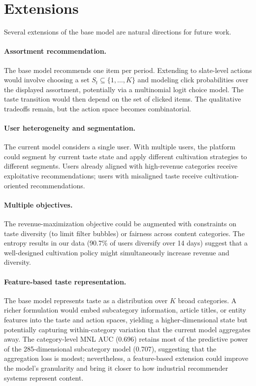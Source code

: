 \documentclass[11pt]{article}
\begin{document}
\section{Extensions}
\label{sec:extensions}

Several extensions of the base model are natural directions for future work.

\paragraph{Assortment recommendation.} The base model recommends one item per period. Extending to slate-level actions would involve choosing a set $S_t \subseteq \{1, \ldots, K\}$ and modeling click probabilities over the displayed assortment, potentially via a multinomial logit choice model. The taste transition would then depend on the set of clicked items. The qualitative tradeoffs remain, but the action space becomes combinatorial.

\paragraph{User heterogeneity and segmentation.} The current model considers a single user. With multiple users, the platform could segment by current taste state and apply different cultivation strategies to different segments. Users already aligned with high-revenue categories receive exploitative recommendations; users with misaligned taste receive cultivation-oriented recommendations.

\paragraph{Multiple objectives.} The revenue-maximization objective could be augmented with constraints on taste diversity (to limit filter bubbles) or fairness across content categories. The entropy results in our data (90.7\% of users diversify over 14 days) suggest that a well-designed cultivation policy might simultaneously increase revenue and diversity.

\paragraph{Feature-based taste representation.} The base model represents taste as a distribution over $K$ broad categories. A richer formulation would embed subcategory information, article titles, or entity features into the taste and action spaces, yielding a higher-dimensional state but potentially capturing within-category variation that the current model aggregates away. The category-level MNL AUC (0.696) retains most of the predictive power of the 285-dimensional subcategory model (0.707), suggesting that the aggregation loss is modest; nevertheless, a feature-based extension could improve the model's granularity and bring it closer to how industrial recommender systems represent content.
\end{document}
